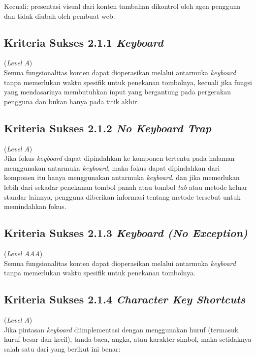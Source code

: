 Kecuali: presentasi visual dari konten tambahan dikontrol oleh agen pengguna dan tidak diubah oleh pembuat web.


\subsection{Kriteria Sukses 2.1.1 \textit{Keyboard}}
\label{subsec:kriteria_2.1.1}
(\textit{Level A}) \\

Semua fungsionalitas konten dapat dioperasikan melalui antarmuka \textit{keyboard} tanpa memerlukan waktu spesifik untuk penekanan tombolnya, kecuali jika fungsi yang mendasarinya membutuhkan input yang bergantung pada pergerakan pengguna dan bukan hanya pada titik akhir.

\subsection{Kriteria Sukses 2.1.2 \textit{No Keyboard Trap}}
\label{subsec:kriteria_2.1.2}
(\textit{Level A}) \\

Jika fokus \textit{keyboard} dapat dipindahkan ke komponen tertentu pada halaman menggunakan antarmuka \textit{keyboard}, maka fokus dapat dipindahkan dari komponen itu hanya menggunakan antarmuka \textit{keyboard}, dan jika memerlukan lebih dari sekadar penekanan tombol panah atau tombol \textit{tab} atau metode keluar standar lainnya, pengguna diberikan informasi tentang metode tersebut untuk memindahkan fokus.

\subsection{Kriteria Sukses 2.1.3 \textit{Keyboard (No Exception)}}
\label{subsec:kriteria_2.1.3}
(\textit{Level AAA}) \\

Semua fungsionalitas konten dapat dioperasikan melalui antarmuka \textit{keyboard} tanpa memerlukan waktu spesifik untuk penekanan tombolnya.

\subsection{Kriteria Sukses 2.1.4 \textit{Character Key Shortcuts}}
\label{subsec:kriteria_2.1.4}
(\textit{Level A}) \\

Jika pintasan \textit{keyboard} diimplementasi dengan menggunakan huruf (termasuk huruf besar dan kecil), tanda baca, angka, atau karakter simbol, maka setidaknya salah satu dari yang berikut ini benar:

